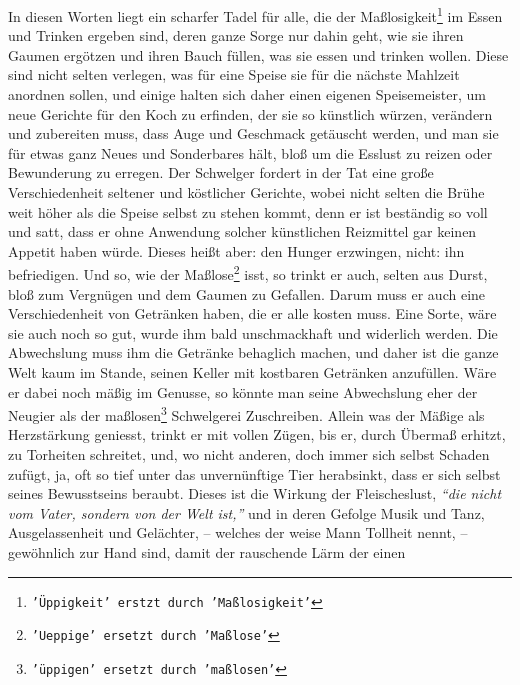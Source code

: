 \medskip

In diesen Worten liegt ein scharfer Tadel für alle, die der 
Maßlosigkeit\footnote{\texttt{'Üppigkeit' erstzt durch 'Maßlosigkeit'}} im Essen
und Trinken ergeben sind, deren ganze Sorge nur dahin geht, wie sie ihren
Gaumen ergötzen und ihren Bauch füllen, was sie essen und trinken wollen. Diese
sind nicht selten verlegen, was für eine Speise sie für die nächste Mahlzeit
anordnen sollen, und einige halten sich daher einen eigenen 
Speisemeister, um
neue Gerichte für den Koch zu erfinden, 
der sie so künstlich würzen, verändern
und zubereiten muss, dass Auge und Geschmack getäuscht werden, und man sie für
etwas ganz Neues und Sonderbares hält, bloß um die Esslust zu reizen oder
Bewunderung zu erregen. Der Schwelger fordert in der Tat eine große
Verschiedenheit seltener und köstlicher Gerichte, wobei nicht selten die Brühe
weit höher als die Speise selbst zu stehen kommt, denn er ist beständig so voll
und satt, dass er ohne Anwendung solcher künstlichen Reizmittel gar keinen
Appetit haben würde. Dieses heißt aber: den Hunger erzwingen, nicht: ihn
befriedigen. Und so, wie der Maßlose\footnote{\texttt{'Ueppige' ersetzt durch 'Maßlose'}} isst, 
so trinkt er auch, selten aus Durst,
bloß zum Vergnügen und dem Gaumen zu Gefallen. Darum muss er auch eine
Verschiedenheit von Getränken haben, die er alle kosten muss. Eine Sorte, wäre
sie auch noch so gut, wurde ihm bald unschmackhaft und widerlich werden. Die
Abwechslung muss ihm die Getränke behaglich machen, und daher ist die ganze Welt
kaum im Stande, seinen Keller mit kostbaren Getränken anzufüllen. Wäre er dabei
noch mäßig im Genusse, so könnte man seine Abwechslung eher der Neugier als der
maßlosen\footnote{\texttt{'üppigen' ersetzt durch 'maßlosen'}} Schwelgerei Zuschreiben. Allein was 
der Mäßige als Herzstärkung
geniesst, trinkt er mit vollen Zügen, bis er, durch Übermaß erhitzt, zu
Torheiten schreitet, und, wo nicht anderen, doch immer sich selbst Schaden
zufügt, ja, oft so tief unter das unvernünftige Tier herabsinkt, dass er sich
selbst seines Bewusstseins beraubt. Dieses ist die Wirkung der Fleischeslust,
\textit{"`die nicht vom Vater, sondern von der Welt ist,"'} und in deren Gefolge Musik 
und Tanz, Ausgelassenheit und Gelächter, -- welches der weise Mann Tollheit
nennt, -- gewöhnlich zur Hand sind, damit der rauschende Lärm der einen
